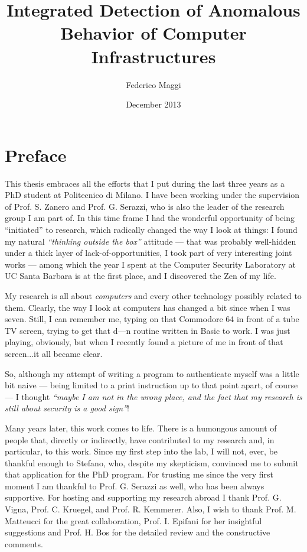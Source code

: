 \documentclass[10pt,a4paper,twoside]{memoir} %
\title{Integrated Detection of Anomalous Behavior of Computer Infrastructures} %
\author{Federico Maggi} %
\date{December 2013} %
\begin{document}
\begin{titlingpage}
\maketitle %
\end{titlingpage}

\frontmatter %


\section*{Preface}
This thesis embraces all the efforts that I put during the last three years as a PhD student at Politecnico di Milano. I have been working under the supervision of Prof. S. Zanero and Prof. G. Serazzi, who is also the leader of the research group I am part of. In this time frame I had the wonderful opportunity of being ``initiated'' to research, which radically changed the way I look at things: I found my natural \emph{``thinking outside the box''} attitude --- that was probably well-hidden under a thick layer of lack-of-opportunities, I took part of very interesting joint works --- among which the year I spent at the Computer Security Laboratory at UC Santa Barbara is at the first place, and I discovered the Zen of my life.

My research is all about \emph{computers} and every other technology possibly related to them. Clearly, the way I look at computers has changed a bit since when I was seven. Still, I can remember me, typing on that \textsf{Commodore} 64 in front of a tube TV screen, trying to get that d---n routine written in \textsf{Basic} to work. I was just playing, obviously, but when I recently found a picture of me in front of that screen...it all became clear.

So, although my attempt of writing a program to authenticate myself was a little bit naive --- being limited to a print instruction up to that point apart, of course --- I thought \emph{``maybe I am not in the wrong place, and the fact that my research is still about security is a good sign''}!

Many years later, this work comes to life. There is a humongous amount of people that, directly or indirectly, have contributed to my research and, in particular, to this work. Since my first step into the lab, I will not, ever, be thankful enough to Stefano, who, despite my skepticism, convinced me to submit that application for the PhD program. For trusting me since the very first moment I am thankful to Prof. G. Serazzi as well, who has been always supportive. For hosting and supporting my research abroad I thank Prof. G. Vigna, Prof. C. Kruegel, and Prof. R. Kemmerer. Also, I wish to thank Prof. M. Matteucci for the great collaboration, Prof. I. Epifani for her insightful suggestions and Prof. H. Bos for the detailed review and the constructive comments.
\end{document}
